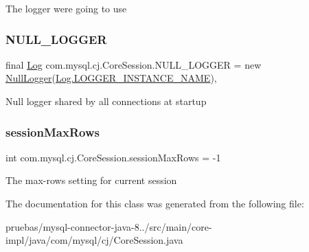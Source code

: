 The logger we\textquotesingle{}re going to use \mbox{\label{classcom_1_1mysql_1_1cj_1_1_core_session_abab1c389edfdd2699a26784b836d1faa}} 
\subsubsection{\texorpdfstring{N\+U\+L\+L\+\_\+\+L\+O\+G\+G\+ER}{NULL\_LOGGER}}
{\footnotesize\ttfamily final \mbox{\hyperlink{interfacecom_1_1mysql_1_1cj_1_1log_1_1_log}{Log}} com.\+mysql.\+cj.\+Core\+Session.\+N\+U\+L\+L\+\_\+\+L\+O\+G\+G\+ER = new \mbox{\hyperlink{classcom_1_1mysql_1_1cj_1_1log_1_1_null_logger}{Null\+Logger}}(\mbox{\hyperlink{interfacecom_1_1mysql_1_1cj_1_1log_1_1_log_aa34677968e5974954c41aaa7f5c6ddec}{Log.\+L\+O\+G\+G\+E\+R\+\_\+\+I\+N\+S\+T\+A\+N\+C\+E\+\_\+\+N\+A\+ME}})\hspace{0.3cm}{\ttfamily [static]}, {\ttfamily [protected]}}

Null logger shared by all connections at startup \mbox{\label{classcom_1_1mysql_1_1cj_1_1_core_session_a6206b6d3a13ba61a394fd6ab6e93eafc}} 
\subsubsection{\texorpdfstring{session\+Max\+Rows}{sessionMaxRows}}
{\footnotesize\ttfamily int com.\+mysql.\+cj.\+Core\+Session.\+session\+Max\+Rows = -\/1\hspace{0.3cm}{\ttfamily [protected]}}

The max-\/rows setting for current session 

The documentation for this class was generated from the following file\+:\begin{DoxyCompactItemize}
\item 
pruebas/mysql-\/connector-\/java-\/8../src/main/core-\/impl/java/com/mysql/cj/Core\+Session.\+java\end{DoxyCompactItemize}
